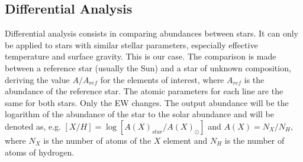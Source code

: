 \documentclass[dvips,12pt,a4paper]{report}
\begin{document}
{%








\subsection {Differential Analysis}
\label {difanal}


Differential analysis consists in comparing abundances between stars. It can only be applied to stars with similar stellar parameters, especially effective temperature and surface gravity. This is our case.  The comparison is made between a reference star (usually the Sun) and a star of unknown composition, deriving the value $A/A_{ref}$ for the elements of interest, where $A_{ref}$ is the abundance of the reference star. The atomic parameters for each line are the same for both stars. Only the EW changes. The output abundance will be the logarithm of the abundance of the star to the solar abundance and will be denoted as, e.g. $[X/H]=\log[A(X)_{star}/A(X)_\odot]$ and $A(X)=N_X/N_H$, where $N_X$ is the number of atoms of the $X$ element and $N_H$ is the number of atoms of hydrogen. %

}
\end{document}

